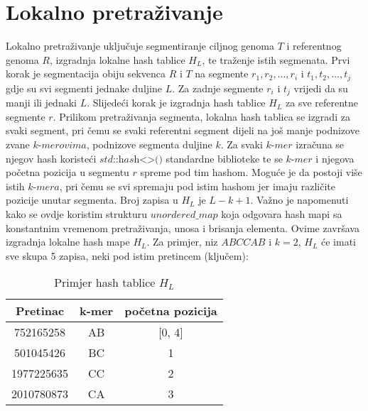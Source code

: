 \documentclass[times, utf8, diplomski]{fer}
\begin{document}
\section{Lokalno pretraživanje}
Lokalno pretraživanje uključuje segmentiranje ciljnog genoma $\textit{T}$ i referentnog genoma $\textit{R}$, izgradnja lokalne hash tablice $\textit{H}_L$, te traženje istih segmenata. Prvi korak je segmentacija obiju sekvenca $\textit{R}$ i $\textit{T}$ na segmente $r_1, r_2,..., r_i$ i $t_1, t_2,..., t_j$ gdje su svi segmenti jednake duljine $L$.  Za zadnje segmente $r_i$ i $t_j$ vrijedi da su manji ili jednaki $L$. Slijedeći korak je izgradnja hash tablice $\textit{H}_L$ za sve referentne segmente $r$. Prilikom pretraživanja segmenta, lokalna hash tablica se izgradi za svaki segment, pri čemu se svaki referentni segment dijeli na još manje podnizove zvane $\textit{k-merovima}$, podnizove segmenta duljine $k$. Za svaki $\textit{k-mer}$ izračuna se njegov hash koristeći $\textit{std::hash<>()}$ standardne biblioteke te se $\textit{k-mer}$ i njegova početna pozicija u segmentu $r$ spreme pod tim hashom. Moguće je da postoji više istih $\textit{k-mera}$, pri čemu se svi spremaju pod istim hashom jer imaju različite pozicije unutar segmenta. Broj zapisa u $\textit{H}_L$ je $L - k  + 1$. Važno je napomenuti kako se ovdje koristim strukturu $\textit{unordered\_map}$ koja odgovara hash mapi sa konstantnim vremenom pretraživanja, unosa i brisanja elementa. Ovime završava izgradnja lokalne hash mape $\textit{H}_L$. Za primjer, niz $\textit{ABCCAB}$ i $k = 2$, $\textit{H}_L$ će imati sve skupa 5 zapisa, neki pod istim pretincem (ključem):
\begin{table} [!h]
\centering
\begin{tabular}{|c || c | c|}
\hline
Pretinac & k-mer & početna pozicija \\
\hline
752165258 & AB & [0, 4] \\
\hline
501045426 & BC & 1 \\
\hline 
1977225635 & CC & 2 \\
\hline
2010780873 & CA & 3 \\
\hline
\end{tabular}
\caption{Primjer hash tablice $\textit{H}_L$}
\end{table}
\end{document}
